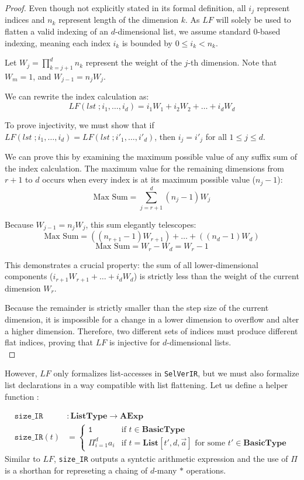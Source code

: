 \documentclass{article}
\begin{document}
\begin{proof}
Even though not explicitly stated in its formal definition, all $i_j$ represent indices and $n_k$ represent length of the dimension $k$. As $\mathit{LF}$ will solely be used to flatten a valid indexing of an $d$-dimensional list, we assume standard 0-based indexing, meaning each index $i_k$ is bounded by $0 \le i_k < n_k$.


Let $W_j = \prod_{k=j+1}^{d} n_k$ represent the weight of the $j$-th dimension. Note that $W_m = 1$, and $W_{j-1} = n_j W_j$.

We can rewrite the index calculation as:
$$\mathit{LF}(lst\;; i_1, \dots, i_d)= i_1 W_1 + i_2 W_2 + \dots + i_d W_d$$

To prove injectivity, we must show that if $\mathit{LF}(lst\;; i_1, \dots, i_d) = \mathit{LF}(lst\;; i'_1, \dots, i'_d)$, then $i_j = i'_j$ for all $1 \le j \le d$.

We can prove this by examining the maximum possible value of any suffix sum of the index calculation. The maximum value for the remaining dimensions from $r+1$ to $d$ occurs when every index is at its maximum possible value ($n_j - 1$):
$$\text{Max Sum} = \sum_{j=r+1}^{d} (n_j - 1) W_j$$

Because $W_{j-1} = n_j W_j$, this sum elegantly telescopes:
$$\text{Max Sum} = ((n_{r+1} - 1) W_{r+1}) + \dots + ((n_d - 1) W_d)$$
$$\text{Max Sum} = W_r - W_d = W_r - 1$$

This demonstrates a crucial property: the sum of all lower-dimensional components ($i_{r+1} W_{r+1} + \dots + i_d W_d$) is strictly less than the weight of the current dimension $W_r$.

Because the remainder is strictly smaller than the step size of the current dimension, it is impossible for a change in a lower dimension to overflow and alter a higher dimension. Therefore, two different sets of indices must produce different flat indices, proving that $\mathit{LF}$ is injective for $d$-dimensional lists. \\
\end{proof}


However, $\mathit{LF}$ only formalizes list-accesses in \texttt{SelVerIR}, but we must also formalize list declarations in a way compatible with list flattening. Let us define a helper function :

\[
\begin{aligned}
\texttt{size\_IR} &: \textbf{ListType} \rightarrow \textbf{AExp} \\
\texttt{size\_IR}(t) &=
\begin{cases}
    \texttt{1} & \text{if } t \in \textbf{BasicType} \\
    \Pi_{i=1}^d{a_i} & \text{if } t = \textbf{List}[t', d, \vec{a}] \text{ for some } t' \in \textbf{BasicType}
\end{cases}
\end{aligned}
\] Similar to $\mathit{LF}$, \texttt{size\_IR} outputs a syntctic arithmetic expression and the use of $\Pi$ is a shorthan for represeting a chaing of $d$-many $\ast$ operations. \\
\end{document}
